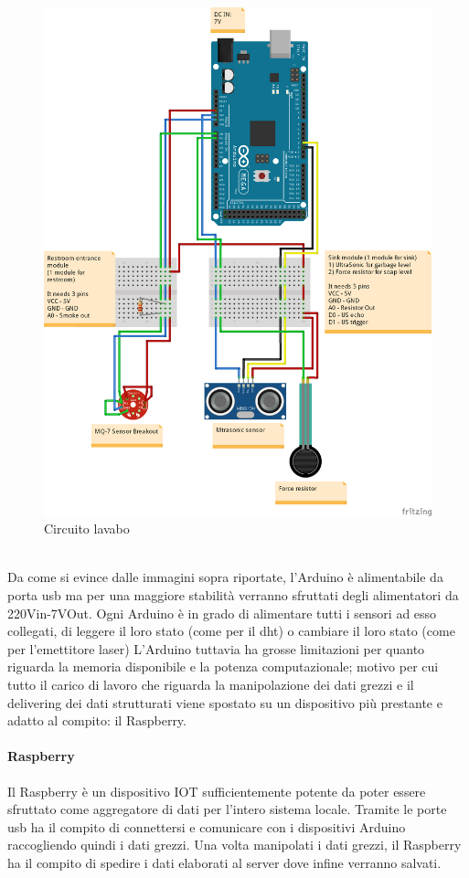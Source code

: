 \documentclass[12pt]{article}
\begin{document}
 \begin{figure}[h!]
\centering
	\includegraphics[scale=0.45]{img/RestroomEntry_bb.png}  
    \caption{Circuito lavabo}
\end{figure}
\\Da come si evince dalle immagini sopra riportate, l'Arduino è alimentabile da porta usb ma per una maggiore stabilità verranno sfruttati degli alimentatori da 220Vin-7VOut.
Ogni Arduino è in grado di alimentare tutti i sensori ad esso collegati, di leggere il loro stato (come per il dht) o cambiare il loro stato (come per l'emettitore laser)
L'Arduino tuttavia ha grosse limitazioni per quanto riguarda la memoria disponibile e la potenza computazionale; motivo per cui tutto il carico di lavoro che riguarda la manipolazione dei dati grezzi e il delivering dei dati strutturati viene spostato su un dispositivo più prestante e adatto al compito: il Raspberry.
\paragraph{Raspberry}
Il Raspberry è un dispositivo IOT sufficientemente potente da poter essere sfruttato come aggregatore di dati per l'intero sistema locale. Tramite le porte usb ha il compito di connettersi e comunicare con i dispositivi Arduino raccogliendo quindi i dati grezzi.
Una volta manipolati i dati grezzi, il Raspberry ha il compito di spedire i dati elaborati al server dove infine verranno salvati.
\end{document}
